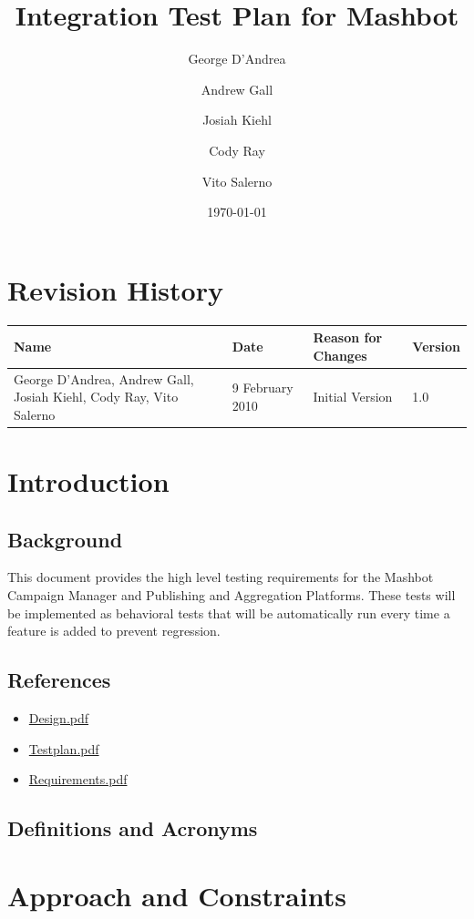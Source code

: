 \documentclass[12pt]{article}
\title{Integration Test Plan for Mashbot}
\author{George D'Andrea \and Andrew Gall \and Josiah Kiehl \and
  Cody Ray \and Vito Salerno}
\date{\today}
\begin{document}
\begin{titlepage}
\maketitle
\end{titlepage}

\section*{Revision History}
\begin{tabular}{|p{2in}|l|l|l|}
  \hline
  \textbf{Name} & \textbf{Date} & \textbf{Reason for Changes} & \textbf{Version} \\
  \hline \hline
  George D'Andrea, Andrew Gall, Josiah Kiehl, Cody Ray, Vito
  Salerno & 9 February 2010 & Initial Version & 1.0 \\
  \hline
\end{tabular}

\clearpage
\tableofcontents
\clearpage

\section{Introduction}
\subsection{Background}
This document provides the high level testing requirements for the Mashbot Campaign Manager and Publishing and Aggregation Platforms.  These tests will be implemented as behavioral tests that will be automatically run every time a feature is added to prevent regression.
\subsection{References}
\begin{itemize}
\item \href{http://mashbot.heroku.com/doc/Design.pdf}{Design.pdf}
\item \href{http://mashbot.heroku.com/doc/Testplan.pdf}{Testplan.pdf}
\item \href{http://mashbot.heroku.com/doc/Requirements.pdf}{Requirements.pdf}
\end{itemize}
\subsection{Definitions and Acronyms}

\section{Approach and Constraints}
\end{document}
